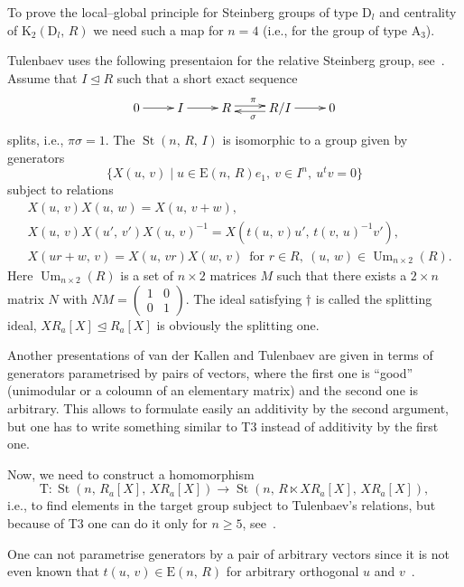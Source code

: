 \documentclass[11pt]{amsart}
\theoremstyle{plain} \declaretheorem[name=Theorem, Refname={Theorem,Theorems}]{tm} \Crefname{tm}{Theorem}{Theorems}
\numberwithin{equation}{section}
\theoremstyle{definition} \newtheorem{df}[lm]{Definition} \Crefname{df}{Definition}{Definitions}
\theoremstyle{remark} \newtheorem{rk}[lm]{Remark} \Crefname{rk}{Remark}{Remarks}
\newcommand{\E}{{\mathrm{E}}}
\newcommand{\Um}{\mathop{\mathrm{Um}}\nolimits}
\newcommand{\St}{\mathop{\mathrm{St}}\nolimits}
\newcommand{\inv}{^{-1}}
\begin{document}
To prove the local--global principle for Steinberg groups of type $\mathrm D_l$ and centrality of $\mathrm K_2(\mathrm D_l,\,R)$ we need such a map for $n=4$ (i.e., for the group of type $\mathrm A_3$).

Tulenbaev uses the following presentaion for the relative Steinberg group, see~\cite[Prop.~1.6]{Tul}. Assume that $I\trianglelefteq R$ such that a short exact sequence
\renewcommand{\theequation}{$\dagger$}
\begin{align}
\xymatrix{
0\ar@<0.1ex>[r]^{}&I\ar@<0.1ex>[r]^{}&R\ar@<0.5ex>[r]^{\pi}&R/I\ar@<0.5ex>[l]^{\sigma}\ar@<0.1ex>[r]^{}&0
}
\end{align}
splits, i.e., $\pi\sigma=1$. The $\St(n,\,R,\,I)$ is isomorphic to a group given by generators
$$
\{X(u,\,v)\mid u\in\E(n,\,R)e_1,\ v\in I^n,\ u^tv=0\}
$$
subject to relations
\setcounter{equation}{0}
\renewcommand{\theequation}{T\arabic{equation}}
\begin{align}
&X(u,\,v)X(u,\,w)=X(u,\,v+w),\\
&X(u,\,v)X(u',\,v')X(u,\,v)\inv=X(t(u,\,v)u',\,t(v,\,u)\inv v'),\\
&X(ur+w,\,v)=X(u,\,vr)X(w,\,v)\,\text{ for }r\in R,\ (u,\,w)\in\Um_{n\times2}(R).
\end{align}
Here $\Um_{n\times2}(R)$ is a set of $n\times2$ matrices $M$ such that there exists a $2\times n$ matrix $N$ with $NM=\begin{pmatrix}1&0\\0&1\end{pmatrix}$. The ideal satisfying $\dagger$ is called the splitting ideal, $XR_a[X]\trianglelefteq R_a[X]$ is obviously the splitting one.

Another presentations of van der Kallen and Tulenbaev are given in terms of generators parametrised by pairs of vectors, where the first one is ``good'' (unimodular or a coloumn of an elementary matrix) and the second one is arbitrary. This allows to formulate easily an additivity by the second argument, but one has to write something similar to T3 instead of additivity by the first one.

Now, we need to construct a homomorphism
$$
\mathrm T\colon\St(n,\,R_a[X],\,XR_a[X])\rightarrow\St(n,\,R\ltimes XR_a[X],\,XR_a[X]),
$$
i.e., to find elements in the target group subject to Tulenbaev's relations, but because of T3 one can do it only for $n\geq5$, see~\cite[Lemmas~1.2 and~1.3\,c)]{Tul}.

One can not parametrise generators by a pair of arbitrary vectors since it is not even known that $t(u,\,v)\in\E(n,\,R)$ for arbitrary orthogonal $u$ and $v$~\cite{Rao}. 
\end{document}
